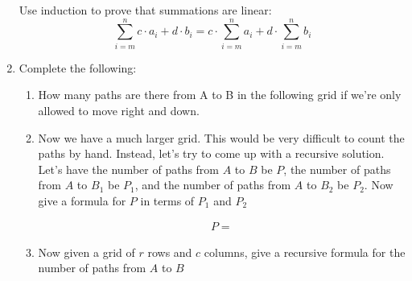 \documentclass[basic, header]{nosvagor-notes}
\begin{document}
\begin{enumerate}
    Use induction to prove that summations are linear:
    \[%
      \sum_{i=m}^n c\cdot a_i + d\cdot b_i = c\cdot \sum_{i=m}^n a_i + d \cdot \sum_{i=m}^n b_i
    \]%

  \newpage %

  \item Complete the following:
    \begin{enumerate}

      \item How many paths are there from A to B in the following grid if we’re
        only allowed to move right and down.

        \begin{center}
        \end{center}

      \item Now we have a much larger grid. This would be very difficult to
        count the paths by hand. Instead, let's try to come up with a recursive
        solution. Let's have the number of paths from $A$ to $B$ be $P$, the
        number of paths from $A$ to $B_1$ be $P_1$, and the number of paths
        from $A$ to $B_2$ be $P_2$. Now give a formula for $P$ in terms of
        $P_1$ and $P_2$

        \begin{center}
        \end{center}

        \begin{align*}
          P=
        \end{align*}

      \item Now given a grid of $r$ rows and $c$ columns, give a recursive
        formula for the number of paths from $A$ to $B$


\end{enumerate}
\end{enumerate}
\end{document}

